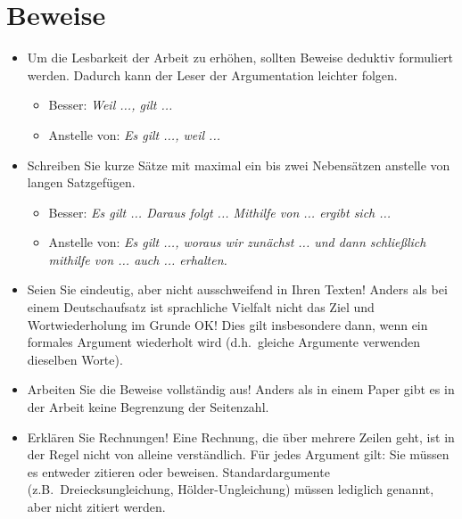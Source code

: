 \section{Beweise}

{\color{change}
\begin{itemize}

\item Um die Lesbarkeit der Arbeit zu erhöhen, sollten Beweise deduktiv formuliert werden. Dadurch kann der Leser der Argumentation leichter folgen.
\begin{itemize}
\item Besser: \emph{Weil ..., gilt ...} 
\item Anstelle von: \emph{Es gilt ..., weil ...}
\end{itemize}

\item Schreiben Sie kurze Sätze mit maximal ein bis zwei Nebensätzen anstelle von langen Satzgefügen.
\begin{itemize}
\item Besser: \emph{Es gilt ... Daraus folgt ... Mithilfe von ... ergibt sich ...}
\item Anstelle von: \emph{Es gilt ..., woraus wir zunächst ... und dann schließlich mithilfe von ... auch ... erhalten.}
\end{itemize}

\item Seien Sie eindeutig, aber nicht ausschweifend in Ihren Texten! Anders als bei einem Deutschaufsatz ist sprachliche Vielfalt nicht das Ziel und Wortwiederholung im Grunde OK! Dies gilt insbesondere dann, wenn ein formales Argument wiederholt wird (d.h.\ gleiche Argumente verwenden dieselben Worte).

\item Arbeiten Sie die Beweise vollständig aus! Anders als in einem Paper gibt es in der Arbeit keine Begrenzung der Seitenzahl.

\item Erklären Sie Rechnungen! Eine Rechnung, die über mehrere Zeilen geht, ist in der Regel nicht von alleine verständlich. Für jedes Argument gilt: Sie müssen es entweder zitieren oder beweisen. Standardargumente (z.B.\ Dreiecksungleichung, H\"older-Ungleichung) müssen lediglich genannt, aber nicht zitiert werden.


\end{itemize}}
